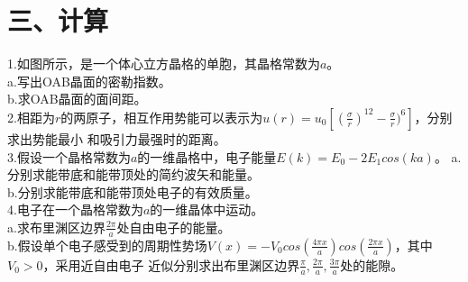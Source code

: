 \documentclass[UTF8]{ctexart}
\begin{document}
\section*{\bfseries 三、计算}
1.如图所示，是一个体心立方晶格的单胞，其晶格常数为$a$。\\
a.写出OAB晶面的密勒指数。\\
b.求OAB晶面的面间距。\\
2.相距为$r$的两原子，相互作用势能可以表示为$u(r)=u_0[(\frac{\sigma}{r})^12-\frac{\sigma}{r})^6]$，分别求出势能最小
和吸引力最强时的距离。\\
3.假设一个晶格常数为$a$的一维晶格中，电子能量$E(k)=E_0-2E_1cos(ka)$。
a.分别求能带底和能带顶处的简约波矢和能量。\\
b.分别求能带底和能带顶处电子的有效质量。\\
4.电子在一个晶格常数为$a$的一维晶体中运动。\\
a.求布里渊区边界$\frac{2\pi}{a}$处自由电子的能量。\\
b.假设单个电子感受到的周期性势场$V(x)=-V_0cos(\frac{4\pi x}{a})cos(\frac{2\pi x}{a})$，其中$V_0>0$，采用近自由电子
近似分别求出布里渊区边界$\frac{\pi}{a},\frac{2\pi}{a},\frac{3\pi}{a}$处的能隙。\\






\newpage
\end{document}
